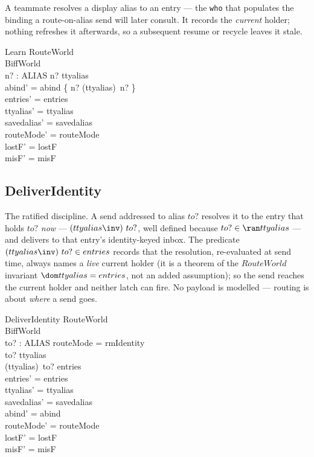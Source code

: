 \documentclass[a4paper,10pt,fleqn]{article}
\begin{document}
A teammate resolves a display alias to an entry --- the \texttt{who} that
populates the binding a route-on-alias send will later consult.  It
records the \emph{current} holder; nothing refreshes it afterwards, so a
subsequent resume or recycle leaves it stale.

\begin{schema}{Learn}
  \Delta RouteWorld \\
  \Xi BiffWorld \\
  n? : ALIAS
  \where
  n? \in \ran ttyalias \\
  abind' = abind \oplus \{ n? \mapsto (ttyalias\inv)~n? \} \\
  entries' = entries \\
  ttyalias' = ttyalias \\
  savedalias' = savedalias \\
  routeMode' = routeMode \\
  lostF' = lostF \\
  misF' = misF
\end{schema}

\subsection{DeliverIdentity}

The ratified discipline.  A send addressed to alias $to?$ resolves it to
the entry that holds $to?$ \emph{now} --- $(ttyalias\inv)~to?$, well
defined because $to? \in \ran ttyalias$ --- and delivers to that entry's
identity-keyed inbox.  The predicate $(ttyalias\inv)~to? \in entries$
records that the resolution, re-evaluated at send time, always names a
\emph{live} current holder (it is a theorem of the $RouteWorld$
invariant $\dom ttyalias = entries$, not an added assumption); so the
send reaches the current holder and neither latch can fire.  No payload
is modelled --- routing is about \emph{where} a send goes.

\begin{schema}{DeliverIdentity}
  \Delta RouteWorld \\
  \Xi BiffWorld \\
  to? : ALIAS
  \where
  routeMode = rmIdentity \\
  to? \in \ran ttyalias \\
  (ttyalias\inv)~to? \in entries \\
  entries' = entries \\
  ttyalias' = ttyalias \\
  savedalias' = savedalias \\
  abind' = abind \\
  routeMode' = routeMode \\
  lostF' = lostF \\
  misF' = misF
\end{schema}
\end{document}
